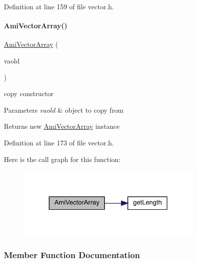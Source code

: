 Definition at line 159 of file vector.\+h.

\mbox{\label{classamici_1_1_ami_vector_array_a3b40abc4d3e4fc0a097834dd56666f41}} 
\paragraph{\texorpdfstring{Ami\+Vector\+Array()}{AmiVectorArray()}\hspace{0.1cm}{\footnotesize\ttfamily [2/2]}}
{\footnotesize\ttfamily \mbox{\hyperlink{classamici_1_1_ami_vector_array}{Ami\+Vector\+Array}} (\begin{DoxyParamCaption}\item[{const \mbox{\hyperlink{classamici_1_1_ami_vector_array}{Ami\+Vector\+Array}} \&}]{vaold }\end{DoxyParamCaption})}

copy constructor 
\begin{DoxyParams}{Parameters}
{\em vaold} & object to copy from \\
\hline
\end{DoxyParams}
\begin{DoxyReturn}{Returns}
new \mbox{\hyperlink{classamici_1_1_ami_vector_array}{Ami\+Vector\+Array}} instance 
\end{DoxyReturn}


Definition at line 173 of file vector.\+h.

Here is the call graph for this function\+:
\nopagebreak
\begin{figure}[H]
\begin{center}
\leavevmode
\includegraphics[width=262pt]{classamici_1_1_ami_vector_array_a3b40abc4d3e4fc0a097834dd56666f41_cgraph}
\end{center}
\end{figure}


\subsubsection{Member Function Documentation}
\mbox{\label{classamici_1_1_ami_vector_array_a5c1b7077b31d3a3be1370ea3e42d13a3}} 
